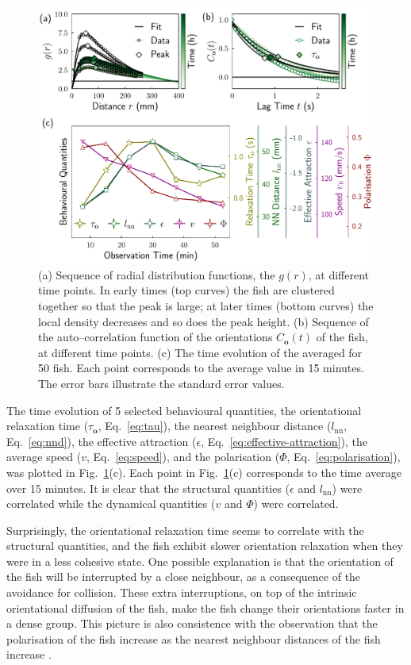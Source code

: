 \documentclass[11pt,twoside]{report}
\begin{document}
 \begin{figure}
  \includegraphics[width=\linewidth,outer]{change-states-2d-50}
  \caption[The changing states of 50 zebrafish in a 2D experiment]{
	(a) Sequence of radial distribution functions, the $g(r)$,  at different time points. In early times (top curves) the fish are clustered together so that the peak is large; at later times (bottom curves) the local density decreases and so does the peak height.
	(b) Sequence of the auto--correlation function of the orientations $C_\mathbf{o}(t)$ of the fish, at different time points.
	(c) The time evolution of the averaged {\descriptors} for 50 {\smallfish} fish. Each point corresponds to the average value in 15 minutes.
	The error bars illustrate the standard error values.
  }
  \label{fig:change-states-2d}
\end{figure}


The time evolution of 5 selected behavioural quantities, the orientational relaxation time ($\tau_\mathbf{o}$, Eq.~\ref{eq:tau}), the nearest neighbour distance ($l_\mathrm{nn}$, Eq.~\ref{eq:nnd}), the effective attraction ($\epsilon$, Eq.~\ref{eq:effective-attraction}), the average speed ($v$, Eq.~\ref{eq:speed}), and the polarisation ($\Phi$, Eq.~\ref{eq:polarisation}), was plotted in Fig.~\ref{fig:change-states-2d}(c). Each point in Fig.~\ref{fig:change-states-2d}(c) corresponds to the time average over 15 minutes. It is clear that the structural quantities ($\epsilon$ and $l_\mathrm{nn}$) were correlated while the dynamical quantities ($v$ and $\Phi$) were correlated.

Surprisingly, the orientational relaxation time seems to correlate with the structural quantities, and the fish exhibit slower orientation relaxation when they were in a less cohesive state. One possible explanation is that the orientation of the fish will be interrupted by a close neighbour, as a consequence of the avoidance for collision. These extra interruptions, on top of the intrinsic orientational diffusion of the fish, make the fish change their orientations faster in a dense group. This picture is also consistence with the observation that the polarisation of the fish increase as the nearest neighbour distances of the fish increase \cite{miller2012}.
\end{document}
